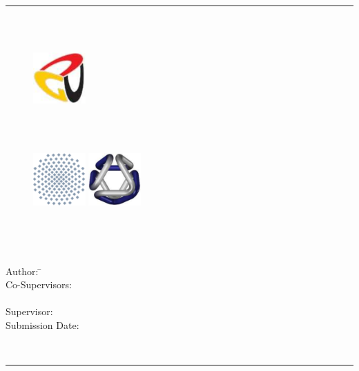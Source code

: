 \thispagestyle{empty}
\begin{center}
	\hrule
	\vspace{1cm}
	{\Large \bf \facultyOne}\\ %
	\vspace{0.3cm}
	{\Large \bf \universityOne}\\ %
	\begin{figure}[htb]
		\centering
		\includegraphics[width=2cm]{logos/logo-university-guc.pdf}
	\end{figure}
	
	\vspace{0.4cm}
	
	{\Large \bf \instituteTwo}\\ %
	\vspace{0.3cm}
	{\Large \bf \universityTwo}\\ %

	\begin{figure}[htb]
		\centering
		\includegraphics[width=2cm]{logos/logo-university-stuttgart.pdf}
		\includegraphics[width=2cm]{logos/logo-university-vis.pdf}
	\end{figure}
	
	\vspace{2cm}
	
	{\Large \bf \titleOfThesis}\\
	\vspace{1cm}
	
	{\large \bf \typeOfThesis}\\
	\vspace{3.8cm}
	
	\parbox{2.5cm}{
			\begin{tabbing}
				Author: \hspace{2cm}
					\=\authorOfThesis\\[2mm]
				Co-Supervisors:
					\>\supervisorOne\\[2mm]
					\>\supervisorTwo\\[2mm]
				Supervisor:
					\>\reviewerOne\\[2mm]
				Submission Date:
					\>\submissionDate\\
			\end{tabbing}
	}\\
	\hrule
\end{center}
